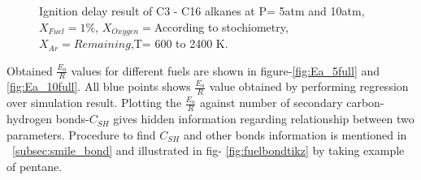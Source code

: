 \documentclass[preprint,12pt]{elsarticle}
\begin{document}
		\begin{figure}[H]\label{fig:simulationFull}
			{
			\centering
			\hspace{0.25cm}
			\caption{Ignition delay result of C3 - C16 alkanes at P= 5atm and 10atm, $X_{Fuel}=1\%$, $X_{Oxygen}= $According to stochiometry, $X_{Ar}= Remaining$,T= 600 to 2400 K.}
		}
		\end{figure}
		Obtained $\frac{E_a}{R}$ values for different fuels are shown in figure-\ref{fig:Ea_5full} and \ref{fig:Ea_10full}. All blue points shows $\frac{E_a}{R}$ value obtained by performing regression over simulation result. Plotting the  $\frac{E_a}{R}$ against number of secondary carbon-hydrogen bonds-$C_{SH}$ gives hidden information regarding relationship between two parameters. Procedure to find $C_{SH}$ and other bonds information is mentioned in ~\ref{subsec:smile_bond} and illustrated in fig- \ref{fig:fuelbondtikz} by taking example of pentane.
		
\end{document}
